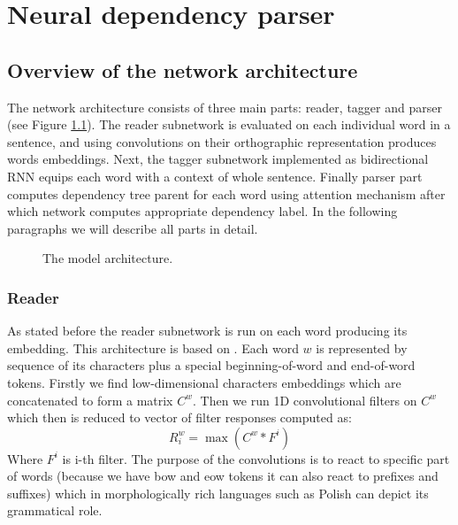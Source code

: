 \chapter{Neural dependency parser}
\section{Overview of the network architecture}
The network architecture consists of three main parts: reader, tagger and parser
(see Figure \ref{fig:architecture}). The reader subnetwork is evaluated on
each individual word in a sentence, and using convolutions on their orthographic
representation produces words embeddings. Next, the tagger subnetwork implemented
as bidirectional RNN equips each word with a context of whole sentence. Finally
parser part computes dependency tree parent for each word using attention mechanism
\cite{vinyals_pointer_2015} after which network computes appropriate dependency label.
In the following paragraphs we will describe all parts in detail.

\begin{figure}[!htbp]
  \centering
  \caption{The model architecture.} 
  \label{fig:architecture}
\end{figure}

\subsection{Reader}
As stated before the reader subnetwork is run on each word producing its embedding.
This architecture is based on \cite{kim_character-aware_2015}. Each word $w$
is represented by sequence of its characters plus a special beginning-of-word and
end-of-word tokens. Firstly we find low-dimensional characters embeddings which
are concatenated to form a matrix $C^w$. Then we run 1D convolutional filters
on $C^w$ which then is reduced to vector of filter responses computed as:
\begin{equation} \label{eq:filter_responses}
    R^w_i = \max( C^w \ast F^i )
\end{equation}
Where $F^i$ is i-th filter. The purpose of the convolutions is to react to
specific part of words (because we have bow and eow tokens it can also react to
prefixes and suffixes) which in morphologically rich languages such as Polish   %
can depict its grammatical role.

